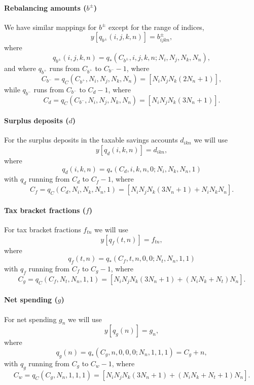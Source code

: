 \documentclass{article}[fleqn,12pt]
\begin{document}
\paragraph*{Rebalancing amounts (\boldmath$b^\pm$)}
We have similar mappings for $b^\pm$ except for the range of indices,
\begin{equation}
	y[q_{b^\pm}(i, j, k, n)] = b^\pm_{ijkn},
\end{equation}
where
\begin{equation}
	q_{b^\pm}(i, j, k, n) = q_*(C_{b^\pm}, i, j, k, n; N_i, N_j, N_k, N_n),
\end{equation}
and where
$q_{b^+}$ runs from $C_{b^+}$ to $C_{b^-} - 1$,
where
\[
	C_{b^-} = q_C(C_{b^+}, N_i, N_j, N_k, N_n) = [N_i N_j N_k (2N_n + 1)],
\]
while
$q_{b^-}$ runs from $C_{b^-}$ to $C_d - 1$, where
\[
	C_d = q_C(C_{b^-}, N_i, N_j, N_k, N_n) = [N_i N_j N_k  (3N_n + 1)].
\]

\paragraph*{Surplus deposits (\boldmath$d$)}
For the surplus deposits in the taxable savings accounts $d_{ikn}$ we will use
\begin{equation}
	y[q_d(i, k, n)] = d_{ikn},
\end{equation}
where
\begin{equation}
	q_d(i, k, n) = q_*(C_d, i, k, n, 0; N_i, N_k, N_n, 1)
\end{equation}
with $q_d$ running from $C_d$ to $C_f - 1$, where
\[
	C_f = q_C(C_d, N_i, N_k, N_n, 1) = [N_iN_jN_k(3N_n+1) + N_iN_kN_n].
\]

\paragraph*{Tax bracket fractions (\boldmath$f$)}
For tax bracket fractions $f_{t n}$ we will use
\begin{equation}
	y[q_f(t, n)] = f_{t n},
\end{equation}
where
\begin{equation}
	q_f(t, n) = q_*(C_f, t, n, 0, 0; N_t, N_n, 1, 1)
\end{equation}
with $q_f$ running from $C_f$ to $C_g - 1$, where
\[
	C_g = q_C(C_f, N_t, N_n, 1, 1) = [N_iN_jN_k(3N_n+1) + (N_iN_k + N_t) N_n].
\]

\paragraph*{Net spending (\boldmath$g$)}
For net spending $g_{n}$ we will use
\begin{equation}
	y[q_g(n)] = g_{n},
\end{equation}
where
\begin{equation}
	q_g(n) = q_*(C_g, n, 0, 0, 0; N_n, 1, 1, 1) = C_g + n,
\end{equation}
with $q_g$ running from $C_g$ to $C_w - 1$, where
\[
	C_w = q_C(C_g, N_n, 1, 1, 1) = [N_iN_jN_k(3N_n+1) + (N_iN_k + N_t + 1) N_n].
\]
\end{document}
